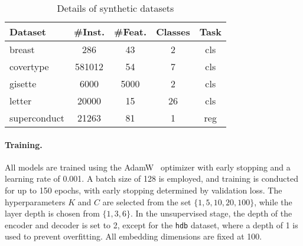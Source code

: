 \begin{table}[ht]
  \centering
  \caption{Details of real-world datasets}
  \vskip 0.15in
  \small
  \label{tab:real_world_dataset_stats}
\vspace{-5pt}
\end{table}


\begin{table}[ht]
  \centering
  \caption{Details of synthetic datasets}
  \vskip 0.15in
  \small
  \begin{tabular}{lcccc}
  \toprule
  \textbf{Dataset} & \textbf{\#Inst.} & \textbf{\#Feat.} & \textbf{Classes} & \textbf{Task} \\
  \midrule
breast & 286 & 43 & 2 & cls \\
covertype & 581012 & 54 & 7 & cls \\
gisette & 6000 & 5000 & 2 & cls \\
letter & 20000 & 15 & 26 & cls \\
superconduct & 21263 & 81 & 1 & reg \\
  \bottomrule
  \end{tabular}
  \label{tab:synthetic_dataset_stats}
\end{table}




\paragraph{Training.} All models are trained using the AdamW~\cite{loshchilov2017decoupled} optimizer with early stopping and a learning rate of 0.001. A batch size of 128 is employed, and training is conducted for up to 150 epochs, with early stopping determined by validation loss. The hyperparameters \(K\) and \(C\) are selected from the set \(\{1, 5, 10, 20, 100\}\), while the layer depth is chosen from \(\{1, 3, 6\}\). In the unsupervised stage, the depth of the encoder and decoder is set to 2, except for the \texttt{hdb} dataset, where a depth of 1 is used to prevent overfitting. All embedding dimensions are fixed at 100.


